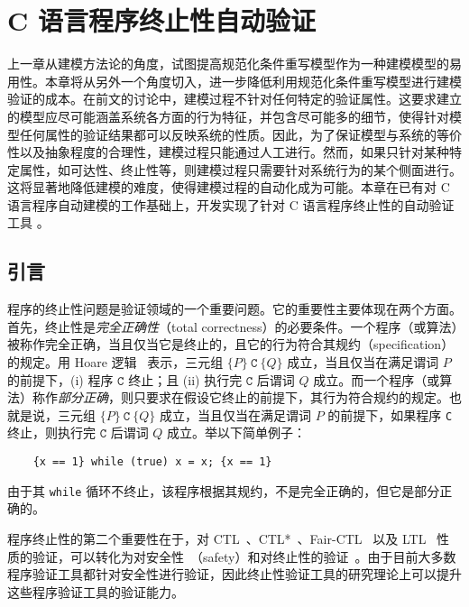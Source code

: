 \chapter{C 语言程序终止性自动验证} 
\label{cha:c-termination}

上一章从建模方法论的角度，试图提高规范化条件重写模型作为一种建模模型的易用性。本章将从另外一个角度切入，进一步降低利用规范化条件重写模型进行建模验证的成本。在前文的讨论中，建模过程不针对任何特定的验证属性。这要求建立的模型应尽可能涵盖系统各方面的行为特征，并包含尽可能多的细节，使得针对模型任何属性的验证结果都可以反映系统的性质。因此，为了保证模型与系统的等价性以及抽象程度的合理性，建模过程只能通过人工进行。然而，如果只针对某种特定属性，如可达性、终止性等，则建模过程只需要针对系统行为的某个侧面进行。这将显著地降低建模的难度，使得建模过程的自动化成为可能。本章在已有对 C 语言程序自动建模的工作基础上，开发实现了针对 C 语言程序终止性的自动验证工具 \CTerm。 

\section{引言}

程序的终止性问题是验证领域的一个重要问题。它的重要性主要体现在两个方面。首先，终止性是\emph{完全正确性}（total correctness）的必要条件。一个程序（或算法）被称作完全正确，当且仅当它是终止的，且它的行为符合其规约（specification）的规定。用 Hoare 逻辑~\cite{DBLP:journals/cacm/Hoare69} 表示，三元组 $\{P\}~\texttt{C}~\{Q\}$ 成立，当且仅当在满足谓词 $P$ 的前提下，(i) 程序 $\texttt{C}$ 终止；且 (ii) 执行完 $\texttt{C}$ 后谓词 $Q$ 成立。而一个程序（或算法）称作\emph{部分正确}，则只要求在假设它终止的前提下，其行为符合规约的规定。也就是说，三元组 $\{P\}~\texttt{C}~\{Q\}$ 成立，当且仅当在满足谓词 $P$ 的前提下，如果程序 \verb|C| 终止，则执行完 $\texttt{C}$ 后谓词 $Q$ 成立。举以下简单例子：
\begin{verbatim}
    {x == 1} while (true) x = x; {x == 1}
\end{verbatim}
由于其 \verb|while| 循环不终止，该程序根据其规约，不是完全正确的，但它是部分正确的。

程序终止性的第二个重要性在于，对 CTL~\cite{DBLP:conf/lop/ClarkeE81}、CTL*~\cite{DBLP:journals/jacm/EmersonH86}、Fair-CTL~\cite{DBLP:journals/jcss/EmersonH85} 以及 LTL~\cite{DBLP:conf/banff/Vardi95} 性质的验证，可以转化为对安全性~\cite{DBLP:journals/tse/Lamport77}（safety）和对终止性的验证~\cite{DBLP:conf/tacas/BrockschmidtCIK16}。由于目前大多数程序验证工具都针对安全性进行验证，因此终止性验证工具的研究理论上可以提升这些程序验证工具的验证能力。

